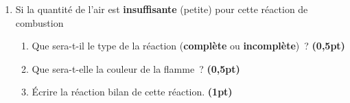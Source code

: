 \begin{enumerate}
    \item Si la quantité de l'air est \textbf{insuffisante} (petite) pour cette
          réaction de combustion
          \begin{enumerate}
              \item Que sera-t-il le type de la réaction (\textbf{complète} ou
                    \textbf{incomplète})~?
                    \textbf{(0,5pt)} \par
              \item Que sera-t-elle la couleur de la flamme~?
                    \textbf{(0,5pt)} \par
              \item Écrire la réaction bilan de cette réaction.
                    \textbf{(1pt)} \par
          \end{enumerate}
\end{enumerate}
